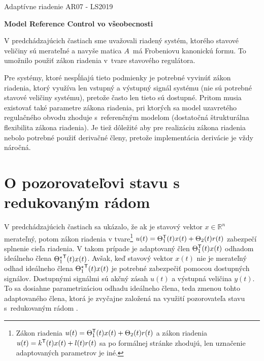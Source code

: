 \documentclass[a4paper, 10pt, ]{article}
\def\oznacenieCasti{AR07 - LS2019}
\begin{document}
\fontsize{12pt}{22pt}\selectfont

\centerline{\textsf{Adaptívne riadenie} \hfill \textsf{\oznacenieCasti}}

\fontsize{18pt}{22pt}\selectfont





\begin{flushleft}
    \textbf{\textsf{Model Reference Control vo všeobecnosti}}
\end{flushleft}





\normalsize

\bigskip

\tableofcontents

\bigskip

\vspace{18pt}






\noindent
V predchádzajúcich častiach sme uvažovali riadený systém, ktorého stavové veličiny sú merateľné a navyše matica $A$~má Frobeniovu kanonickú formu. To umožnilo použiť zákon riadenia v~tvare stavového regulátora.

Pre systémy, ktoré nespĺňajú tieto podmienky je potrebné vyvinúť zákon riadenia, ktorý využíva len vstupný a výstupný signál systému (nie sú potrebné stavové veličiny systému), pretože často len tieto sú dostupné. Pritom musia existovať také parametre zákona riadenia, pri ktorých sa model uzavretého regulačného obvodu zhoduje s~referenčným modelom (dostatočná štrukturálna flexibilita zákona riadenia). Je tiež dôležité aby pre realizáciu zákona riadenia nebolo potrebné použiť derivačné členy, pretože implementácia derivácie je vždy náročná.








\section{O pozorovateľovi stavu s redukovaným rádom}


V predchádzajúcich častiach sa ukázalo, že ak je stavový vektor $x \in \mathbb{R}^n$ merateľný, potom zákon riadenia v tvare\footnote{Zákon riadenia $u(t) = \Theta_1^{\mathsf{T}}(t) x(t) + \Theta_2(t) r(t)$ a zákon riadenia $u(t) = k^{\mathsf{T}}(t) x(t) + l(t) r(t)$ sa po formálnej stránke zhodujú, len uznačenie adaptovaných parametrov je iné.} $u(t) = \Theta_1^{\mathsf{T}}(t) x(t) + \Theta_2(t) r(t)$ zabezpečí splnenie cieľa riadenia. V takom prípade je adaptovaný člen $\Theta_1^{\mathsf{T}}(t) x(t)$ odhadom ideálneho člena ${\Theta_1^\star}^{\mathsf{T}}(t) x(t)$. Avšak, keď stavový vektor $x(t)$ nie je merateľný odhad ideálneho člena ${\Theta_1^\star}^{\mathsf{T}}(t) x(t)$ je potrebné zabezpečiť pomocou dostupných signálov. Dostupnými signálmi sú akčný zásah $u(t)$ a výstupná veličina $y(t)$. To sa dosiahne parametrizáciou odhadu ideálneho člena, teda zmenou tohto adaptovaného člena, ktorá je zvyčajne založená na využití pozorovateľa stavu s~redukovaným rádom \cite{Tao03}.
\end{document}
